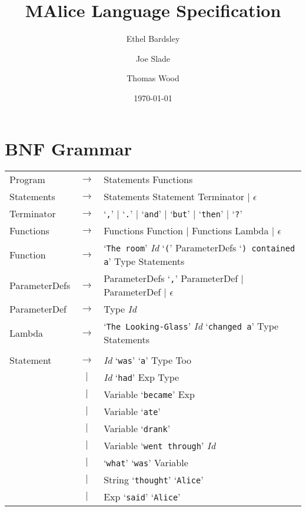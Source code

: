 \documentclass[a4paper,11pt]{article}
\begin{document}
\title{MAlice Language Specification}

\author{Ethel Bardsley \and Joe Slade \and Thomas Wood}

\date{\today}         %

\maketitle            %

\section{BNF Grammar} 
\begin{tabular}{lcl}
Program     & $\to$ & Statements Functions \\
Statements  & $\to$ & Statements Statement Terminator $|$ $\epsilon$ \\
Terminator  & $\to$ & `\verb:,:' $|$ `\verb:.:' $|$ `\verb:and:' $|$ `\verb:but:' $|$ `\verb:then:' $|$ `\verb|?|'\\
Functions   & $\to$ & Functions Function $|$ Functions Lambda $|$ $\epsilon$ \\
Function    & $\to$ & `\verb|The room|' \emph{Id} `\verb|(|' ParameterDefs `\verb|) contained a|' Type Statements \\
ParameterDefs & $\to$ & ParameterDefs `\verb|,|' ParameterDef $|$ ParameterDef $|$ $\epsilon$ \\
ParameterDef  & $\to$ & Type \emph{Id} \\
Lambda      & $\to$ & `\verb|The Looking-Glass|' \emph{Id} `\verb|changed a|' Type Statements \\
\\
Statement   & $\to$ & \emph{Id} `\verb|was|' `\verb|a|' Type Too \\
            &  $|$  & \emph{Id} `\verb|had|' Exp Type \\
            &  $|$  & Variable `\verb|became|' Exp \\
            &  $|$  & Variable `\verb|ate|' \\
            &  $|$  & Variable `\verb|drank|' \\
            &  $|$  & Variable `\verb|went through|' \emph{Id} \\
            &  $|$  & `\verb|what|' `\verb|was|' Variable \\
            &  $|$  & String `\verb|thought|' `\verb|Alice|' \\
            &  $|$  & Exp `\verb|said|' `\verb|Alice|' \\

\end{tabular}
\end{document}
